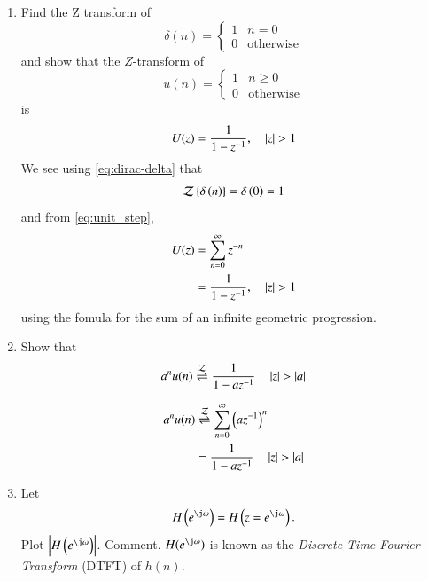 \documentclass[journal,12pt,twocolumn]{IEEEtran}
\renewcommand\thesection{\arabic{section}}
\begin{document}
\begin{enumerate}[label=\thesection.\arabic*]
\item Find the Z transform of 
\begin{equation}
\delta(n) =
\begin{cases}
1 & n = 0 \\
0 & \text{otherwise}
\end{cases}
\label{eq:dirac-delta}
\end{equation}
and show that the $Z$-transform of
\begin{equation}
\label{eq:unit_step}
u(n) =
\begin{cases}
1 & n \ge 0 \\
0 & \text{otherwise}
\end{cases}
\end{equation}
is
\begin{equation}
U(z) = \frac{1}{1-z^{-1}}, \quad \left\vert z\right\vert > 1
\end{equation}
\solution We see using \eqref{eq:dirac-delta} that
\begin{align}
	\mathcal{Z}\left\{\delta\left(n\right)\right\} = \delta\left(0\right) = 1
\end{align}
and from \eqref{eq:unit_step},
\begin{align}
U(z) &= \sum _{n= 0}^{\infty}z^{-n} \\
&=\frac{1}{1-z^{-1}}, \quad \left\vert z\right\vert > 1
\end{align}
using the fomula for the sum of an infinite geometric progression.

\item Show that 
\begin{equation}
\label{eq:anun}
a^nu(n) \overset{\mathcal{Z}}{ \rightleftharpoons} \frac{1}{1-az^{-1}} \quad \left\vert z\right\vert > \left\vert a\right\vert
\end{equation}

\solution
\begin{align}
	a^nu(n) &\overset{\mathcal{Z}}{ \rightleftharpoons} \sum_{n = 0}^{\infty}\left(az^{-1}\right)^n \\
			&= \frac{1}{1-az^{-1}} \quad \left\vert z\right\vert > \left\vert a\right\vert
\end{align}

\item 
Let
\begin{equation}
H\brak{e^{\j \omega}} = H\brak{z = e^{\j \omega}}.
\end{equation}
Plot $\abs{H\brak{e^{\j\omega}}}$.  Comment.  $H(e^{\j \omega})$ is
known as the {\em Discrete Time Fourier Transform} (DTFT) of $h(n)$.


\end{enumerate}
\end{document}
